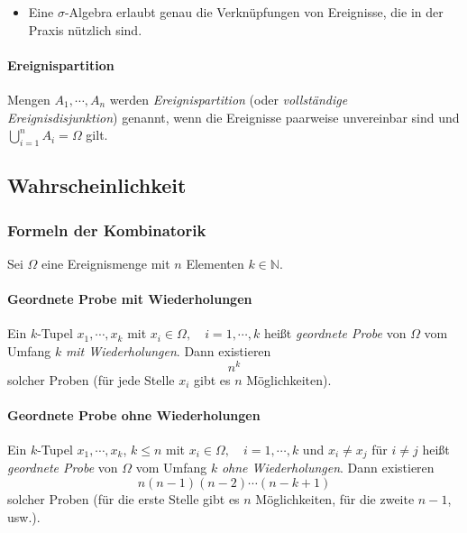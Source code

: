 \documentclass[a4paper, 11pt, accentcolor = tud3b]{tudreport}
\newcommand{\N}{\ensuremath{\mathbb{N}}}
\begin{document}
	                    \begin{itemize}
	                    	\item Eine \(\sigma\)-Algebra erlaubt genau die Verknüpfungen von Ereignisse, die in der Praxis nützlich sind.
	                    \end{itemize}

                    \paragraph{Ereignispartition}
                        Mengen \( A_1, \cdots, A_n \) werden \textit{Ereignispartition} (oder \textit{vollständige Ereignisdisjunktion}) genannt, wenn die Ereignisse paarweise unvereinbar sind und \( \bigcup_{i = 1}^n A_i = \Omega \) gilt.

            \subsection{Wahrscheinlichkeit}
                \subsubsection{Formeln der Kombinatorik}
	                Sei \( \Omega \) eine Ereignismenge mit \( n \) Elementen \( k \in \N \).
                
                    \paragraph{Geordnete Probe mit Wiederholungen}
                        Ein \(k\)-Tupel \( x_1, \cdots, x_k \) mit \( x_i \in \Omega, \quad i = 1, \cdots, k \) heißt \textit{geordnete Probe} von \(\Omega\) vom Umfang \(k\) \textit{mit Wiederholungen}. Dann existieren
                        \begin{equation*}
	                        n^k
                        \end{equation*}
                        solcher Proben (für jede Stelle \(x_i\) gibt es \(n\) Möglichkeiten).

                    \paragraph{Geordnete Probe ohne Wiederholungen}
                        Ein \(k\)-Tupel \( x_1, \cdots, x_k \), \( k \leq n \) mit \( x_i \in \Omega, \quad i = 1, \cdots, k \) und \( x_i \neq x_j \) für \( i \neq j \) heißt \textit{geordnete Probe} von \(\Omega\) vom Umfang \(k\) \textit{ohne Wiederholungen}. Dann existieren
                        \begin{equation*}
	                        n(n - 1)(n - 2) \cdots (n - k + 1)
                        \end{equation*}
                        solcher Proben (für die erste Stelle gibt es \(n\) Möglichkeiten, für die zweite \(n - 1\), usw.).
                        
\end{document}
